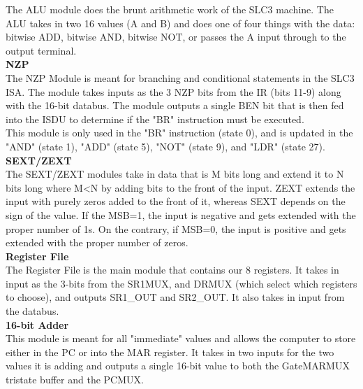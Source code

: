 \documentclass[journal, twocolumn, final,11pt,letterpaper]{IEEEtran}
\begin{document}
The ALU module does the brunt arithmetic work of the SLC3 machine.  The ALU takes in two 16 values (A and B) and does one of four things with the data: bitwise ADD, bitwise AND, bitwise NOT, or passes the A input through to the output terminal. \\

\normalsize\textbf{NZP} \\

The NZP Module is meant for branching and conditional statements in the SLC3 ISA. The module takes inputs as the 3 NZP bits from the IR (bits 11-9) along with the 16-bit databus. The module outputs a single BEN bit that is then fed into the ISDU to determine if the "BR" instruction must be executed. \\

This module is only used in the "BR" instruction (state 0), and is updated in the "AND" (state 1), "ADD" (state 5), "NOT" (state 9), and "LDR" (state 27). \\


\normalsize\textbf{SEXT/ZEXT} \\

The SEXT/ZEXT modules take in data that is M bits long and extend it to N bits long where M<N by adding bits to the front of the input.  ZEXT extends the input with purely zeros added to the front of it, whereas SEXT depends on the sign of the value.  If the MSB=1, the input is negative and gets extended with the proper number of 1s.  On the contrary, if MSB=0, the input is positive and gets extended with the proper number of zeros.  \\

\normalsize\textbf{Register File} \\

The Register File is the main module that contains our 8 registers. It takes in input as the 3-bits from the SR1MUX, and DRMUX (which select which registers to choose), and outputs SR1\_OUT and SR2\_OUT. It also takes in input from the databus.\\

\normalsize\textbf{16-bit Adder} \\

This module is meant for all "immediate" values and allows the computer to store either in the PC or into the MAR register. It takes in two inputs for the two values it is adding and outputs a single 16-bit value to both the GateMARMUX tristate buffer and the PCMUX. \\
\end{document}
